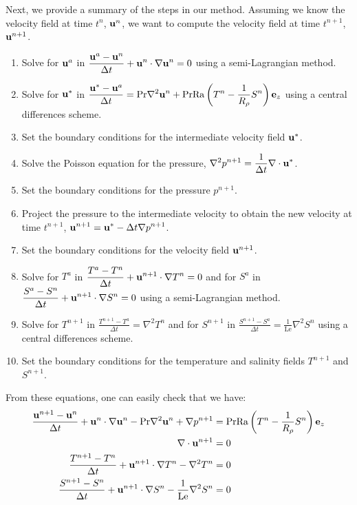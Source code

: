 \documentclass{article}
\def\Ra{\mathrm{Ra}}
\def\Pr{\mathrm{Pr}}
\def\Le{\mathrm{Le}}
\begin{document}
Next, we provide a summary of the steps in our method. Assuming we know the velocity field at time $t^n$, $\boldsymbol{\mathrm{u}}^n$, we want to compute the velocity field at time $t^{n+1}$, $\boldsymbol{\mathrm{u}}^{n+1}$.
\begin{enumerate}
  \item Solve for $\boldsymbol{\mathrm{u}}^a$ in $\displaystyle  \frac{\boldsymbol{\mathrm{u}}^a-\boldsymbol{\mathrm{u}}^n}{\Delta t} + \boldsymbol{\mathrm{u}}^n \cdot \nabla \boldsymbol{\mathrm{u}}^n = 0$ using a semi-Lagrangian method.
  \item Solve for $\boldsymbol{\mathrm{u}}^*$ in $\displaystyle  \frac{\vf{u}^* - \vf{u}^a}{\Delta t} = \Pr \nabla^2 \vf{u}^n +\Pr\Ra\left(T^n - \frac{1}{R_{\rho}}S^n\right)\vf{e}_z$ using a central differences scheme.
  \item Set the boundary conditions for the intermediate velocity field $\boldsymbol{\mathrm{u}}^*$.
  \item Solve the Poisson equation for the pressure, $\displaystyle \nabla^2 p^{n+1} = \frac{1}{\Delta t}\nabla \cdot \boldsymbol{\mathrm{u}}^*$.
  \item Set the boundary conditions for the pressure $p^{n+1}$.
  \item Project the pressure to the intermediate velocity to obtain the new velocity at time $t^{n+1}$, $\displaystyle \boldsymbol{\mathrm{u}}^{n+1} = \boldsymbol{\mathrm{u}}^* - \Delta t\nabla p^{n+1}$.
  \item Set the boundary conditions for the velocity field $\boldsymbol{\mathrm{u}}^{n+1}$.
  \item Solve for $T^{a}$ in $\displaystyle  \frac{T^{a}-T^{n}}{\Delta t} + \boldsymbol{\mathrm{u}}^{n+1} \cdot \nabla T^{n} = 0$ and for $S^{a}$ in $\displaystyle  \frac{S^{a}-S^{n}}{\Delta t} + \boldsymbol{\mathrm{u}}^{n+1} \cdot \nabla S^{n} = 0$ using a semi-Lagrangian method.
  \item Solve for $T^{n+1}$ in $\displaystyle  \frac{T^{n+1}-T^{a}}{\Delta t} = \nabla^2 T^{n}$ and for $S^{n+1}$ in $\displaystyle  \frac{S^{n+1}-S^{a}}{\Delta t} = \frac{1}{\Le}\nabla^2 S^{n}$ using a central differences scheme.
  \item Set the boundary conditions for the temperature and salinity fields $T^{n+1}$ and $S^{n+1}$.
\end{enumerate}
From these equations, one can easily check that we have:
\begin{align*}
  \frac{\vf{u}^{n+1}-\vf{u}^n}{\Delta t} + \vf{u}^n \cdot \nabla \vf{u}^n - \Pr \nabla^2 \vf{u}^n + \nabla p^{n+1} & = \Pr\Ra\left(T^n - \frac{1}{R_{\rho}}S^n\right)\vf{e}_z \\
  \nabla \cdot \vf{u}^{n+1}                                                                                        & = 0 \\
  \frac{T^{n+1}-T^{n}}{\Delta t} + \vf{u}^{n+1} \cdot \nabla T^{n} - \nabla^2 T^{n}                                & = 0 \\
  \frac{S^{n+1}-S^{n}}{\Delta t} + \vf{u}^{n+1} \cdot \nabla S^{n} - \frac{1}{\Le}\nabla^2 S^{n}                   & = 0
\end{align*}
\end{document}
